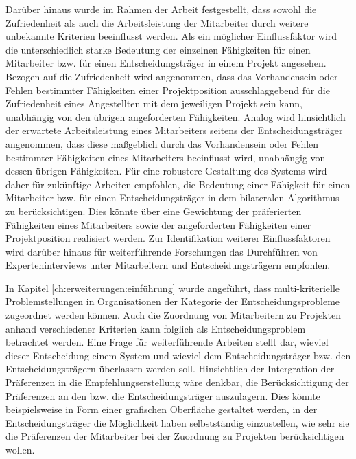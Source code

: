 Darüber hinaus wurde im Rahmen der Arbeit festgestellt, dass sowohl die Zufriedenheit als auch die Arbeitsleistung der Mitarbeiter durch weitere unbekannte Kriterien beeinflusst werden.
Als ein möglicher Einflussfaktor wird die unterschiedlich starke Bedeutung der einzelnen Fähigkeiten für einen Mitarbeiter bzw. für einen Entscheidungsträger in einem Projekt angesehen.
Bezogen auf die Zufriedenheit wird angenommen, dass das Vorhandensein oder Fehlen bestimmter Fähigkeiten einer Projektposition ausschlaggebend für die Zufriedenheit eines Angestellten mit dem jeweiligen Projekt sein kann, unabhängig von den übrigen angeforderten Fähigkeiten.
Analog wird hinsichtlich der erwartete Arbeitsleistung eines Mitarbeiters seitens der Entscheidungsträger angenommen, dass diese maßgeblich durch das Vorhandensein oder Fehlen bestimmter Fähigkeiten eines Mitarbeiters beeinflusst wird, unabhängig von dessen übrigen Fähigkeiten.
Für eine robustere Gestaltung des Systems wird daher für zukünftige Arbeiten empfohlen, die Bedeutung einer Fähigkeit für einen Mitarbeiter bzw. für einen Entscheidungsträger in dem bilateralen Algorithmus zu berücksichtigen.
Dies könnte über eine Gewichtung der präferierten Fähigkeiten eines Mitarbeiters sowie der angeforderten Fähigkeiten einer Projektposition realisiert werden.
Zur Identifikation weiterer Einflussfaktoren wird darüber hinaus für weiterführende Forschungen das Durchführen von Experteninterviews unter Mitarbeitern und Entscheidungsträgern empfohlen.

In Kapitel \ref{ch:erweiterungen:einführung} wurde angeführt, dass multi-kriterielle Problemstellungen in Organisationen der Kategorie der Entscheidungsprobleme zugeordnet werden können.
Auch die Zuordnung von Mitarbeitern zu Projekten anhand verschiedener Kriterien kann folglich als Entscheidungsproblem betrachtet werden.
Eine Frage für weiterführende Arbeiten stellt dar, wieviel dieser Entscheidung einem System und wieviel dem Entscheidungsträger bzw. den Entscheidungsträgern überlassen werden soll.
Hinsichtlich der Intergration der Präferenzen in die Empfehlungserstellung wäre denkbar, die Berücksichtigung der Präferenzen an den bzw. die Entscheidungsträger auszulagern.
Dies könnte beispielsweise in Form einer grafischen Oberfläche gestaltet werden, in der Entscheidungsträger die Möglichkeit haben selbstständig einzustellen, wie sehr sie die Präferenzen der Mitarbeiter bei der Zuordnung zu Projekten berücksichtigen wollen.


